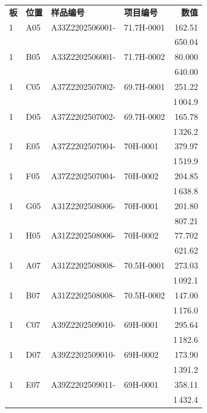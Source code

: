 \documentclass[UTF8,10pt,a4paper,fontset=fandol]{ctexart}
\begin{document}
\begin{center}
\small
\begin{tabular}{@{}llllr@{}}
\textbf{板} & \textbf{位置} & \textbf{样品编号} & \textbf{项目编号} & \textbf{数值} \\
1 & A05 & A33Z2202506001- & 71.7H-0001 & 162.51 \\
  &     &                  &              & 650.04 \\
1 & B05 & A33Z2202506001- & 71.7H-0002 & 80.000 \\
  &     &                  &              & 640.00 \\
1 & C05 & A37Z2202507002- & 69.7H-0001 & 251.22 \\
  &     &                  &              & 1\,004.9 \\
1 & D05 & A37Z2202507002- & 69.7H-0002 & 165.78 \\
  &     &                  &              & 1\,326.2 \\
1 & E05 & A37Z2202507004- & 70H-0001 & 379.97 \\
  &     &                  &            & 1\,519.9 \\
1 & F05 & A37Z2202507004- & 70H-0002 & 204.85 \\
  &     &                  &            & 1\,638.8 \\
1 & G05 & A31Z2202508006- & 70H-0001 & 201.80 \\
  &     &                  &            & 807.21 \\
1 & H05 & A31Z2202508006- & 70H-0002 & 77.702 \\
  &     &                  &            & 621.62 \\
1 & A07 & A31Z2202508008- & 70.5H-0001 & 273.03 \\
  &     &                  &              & 1\,092.1 \\
1 & B07 & A31Z2202508008- & 70.5H-0002 & 147.00 \\
  &     &                  &              & 1\,176.0 \\
1 & C07 & A39Z2202509010- & 69H-0001 & 295.64 \\
  &     &                  &            & 1\,182.6 \\
1 & D07 & A39Z2202509010- & 69H-0002 & 173.90 \\
  &     &                  &            & 1\,391.2 \\
1 & E07 & A39Z2202509011- & 69H-0001 & 358.11 \\
  &     &                  &            & 1\,432.4 \\

\end{tabular}
\end{center}
\end{document}
